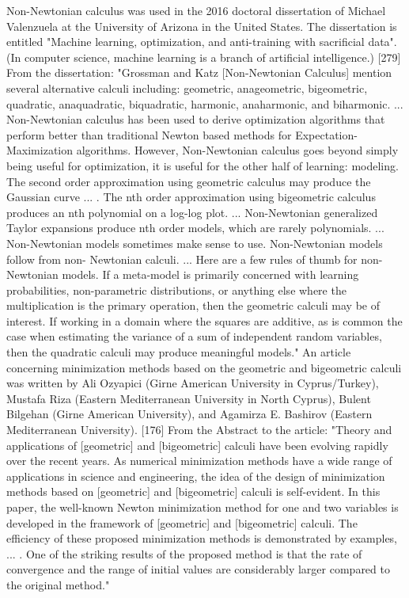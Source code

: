 \documentclass[12pt]{article}
\begin{document}
Non-Newtonian calculus was used in the 2016 doctoral dissertation of Michael Valenzuela at the University of Arizona in the United States. The dissertation is entitled "Machine learning, optimization, and anti-training with sacrificial data". (In computer science, machine learning is a branch of artificial intelligence.) [279] From the dissertation: "Grossman and Katz [Non-Newtonian Calculus] mention several alternative calculi including: geometric, anageometric, bigeometric, quadratic, anaquadratic, biquadratic, harmonic, anaharmonic, and biharmonic. ... Non-Newtonian calculus has been used to derive optimization algorithms that perform better than traditional Newton based methods for Expectation-Maximization algorithms. However, Non-Newtonian calculus goes beyond simply being useful for optimization, it is useful for the other half of learning: modeling. The second order approximation using geometric calculus may produce the Gaussian curve ... . The nth order approximation using bigeometric calculus produces an nth polynomial on a log-log plot. ... Non-Newtonian generalized Taylor expansions produce nth order models, which are rarely polynomials. ... Non-Newtonian models sometimes make sense to use. Non-Newtonian models follow from non- Newtonian calculi. ... Here are a few rules of thumb for non-Newtonian models. If a meta-model is primarily concerned with learning probabilities, non-parametric distributions, or anything else where the multiplication is the primary operation, then the geometric calculi may be of interest. If working in a domain where the squares are additive, as is common the case when estimating the variance of a sum of independent random variables, then the quadratic calculi may produce meaningful models."
An article concerning minimization methods based on the geometric and bigeometric calculi was written by Ali Ozyapici (Girne American University in Cyprus/Turkey), Mustafa Riza (Eastern Mediterranean University in North Cyprus), Bulent Bilgehan (Girne American University), and Agamirza E. Bashirov (Eastern Mediterranean University). [176] From the Abstract to the article: "Theory and applications of [geometric] and [bigeometric] calculi have been evolving rapidly over the recent years. As numerical minimization methods have a wide range of applications in science and engineering, the idea of the design of minimization methods based on [geometric] and [bigeometric] calculi is self-evident. In this paper, the well-known Newton minimization method for one and two variables is developed in the framework of [geometric] and [bigeometric] calculi. The efficiency of these proposed minimization methods is demonstrated by examples, ... . One of the striking results of the proposed method is that the rate of convergence and the range of initial values are considerably larger compared to the original method."
\end{document}
